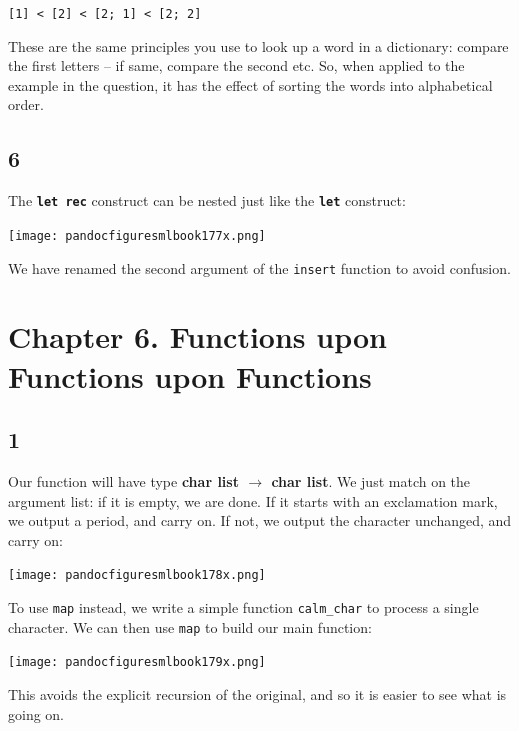 \documentclass[]{book}
\newcommand{\smspace}{\vspace{4mm}}
\begin{document}
\smspace
\noindent \texttt{[1] < [2] < [2; 1] < [2; 2]}
\smspace

\noindent These are the same principles you use to look up a word in a dictionary: compare the first letters -- if same, compare the second etc. So, when applied to the example in the question, it has the effect of sorting the words into alphabetical order.

\subsection*{6}
The \textbf{\texttt{let rec}} construct can be nested just like the \textbf{\texttt{let}} construct:

\medskip
\begin{center}
\noindent\texttt{[image: pandocfiguresmlbook177x.png]}
\end{center}
\medskip

\noindent We have renamed the second argument of the \texttt{insert} function to avoid confusion.

\section*{Chapter 6. Functions upon Functions upon Functions}
\subsection*{1}
Our function will have type \textbf{\textsf{char list $\rightarrow$ char list}}. We just match on the argument list: if it is empty, we are done. If it starts with an exclamation mark, we output a period, and carry on. If not, we output the character unchanged, and carry on:

\medskip
\begin{center}
\noindent\texttt{[image: pandocfiguresmlbook178x.png]}
\end{center}
\medskip

\noindent To use \texttt{map} instead, we write a simple function \texttt{calm\_char} to process a single character. We can then use \texttt{map} to build our main function:

\medskip
\begin{center}
\noindent\texttt{[image: pandocfiguresmlbook179x.png]}
\end{center}
\medskip

\noindent This avoids the explicit recursion of the original, and so it is easier to see what is going on.
\end{document}
